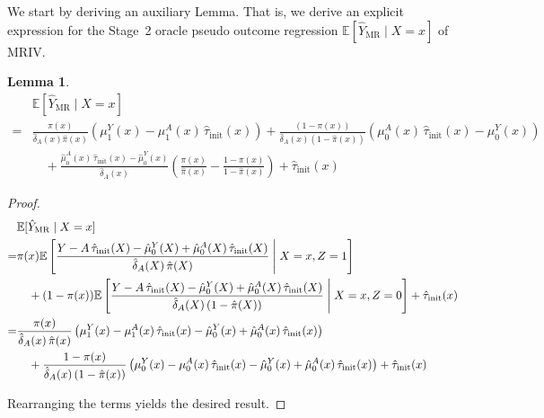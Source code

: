 \documentclass{article} %
\newcommand{\E}{\mathbb{E}}
\newcommand{\frameworkname}{MRIV\xspace}
\theoremstyle{definition}
\theoremstyle{plain}
\newtheorem{lemma}{Lemma}
\begin{document}
We start by deriving an auxiliary Lemma. That is, we derive an explicit expression for the Stage~2 oracle pseudo outcome regression $\E[\hat{Y}_{\mathrm{MR}} \mid X=x]$ of \frameworkname.
\begin{lemma}\label{lem:second_stage}
\begin{equation}
\begin{split}
    & \E[\hat{Y}_{\mathrm{MR}} \mid X=x] \\
    = & 
   \frac{\pi(x)}{\hat{\delta}_A(x) \hat{\pi}(x)} \left(\mu_1^Y(x) - \mu_1^A(x) \, \hat{\tau}_{\mathrm{init}}(x)\right)
   + \frac{(1-\pi(x))}{\hat{\delta}_A(x)(1 - \hat{\pi}(x))} \left(\mu_0^A(x) \, \hat{\tau}_{\mathrm{init}}(x) -\mu_0^Y(x) \right)\\ & \quad + 
   \frac{\hat{\mu}_0^A(x) \, \hat{\tau}_{\mathrm{init}}(x) - \hat{\mu}_0^Y (x)}{\hat{\delta}_A(x)} \left(\frac{\pi(x)}{\hat{\pi}(x)} - \frac{1- \pi(x)}{1-\hat{\pi}(x)} \right) + \hat{\tau}_{\mathrm{init}}(x)   
\end{split}
\end{equation}
\end{lemma}

\begin{proof}
\begin{align}
 &\E[\hat{Y}_{\mathrm{MR}} \mid X=x]\\ =& \pi(x) \E\left[ \frac{Y - A \, \hat{\tau}_{\mathrm{init}}(X) - \hat{\mu}_0^Y(X) + \hat{\mu}_0^A(X) \, \hat{\tau}_{\mathrm{init}}(X)} {\hat{\delta}_A(X) \, \hat{\pi}(X)} \; \middle| \; X = x, Z = 1\right] \notag\\ 
 & \quad + (1 - \pi(x)) \E\left[ \frac{Y - A \, \hat{\tau}_{\mathrm{init}}(X) - \hat{\mu}_0^Y(X) + \hat{\mu}_0^A(X) \, \hat{\tau}_{\mathrm{init}}(X)}{\hat{\delta}_A(X) \, (1 - \hat{\pi}(X))} \; \middle| \; X = x, Z = 0\right] + \hat{\tau}_{\mathrm{init}}(x)\\
  =& \frac{\pi(x)}{\hat{\delta}_A(x) \, \hat{\pi}(x)} \left( \mu_1^Y(x) - \mu_1^A(x) \, \hat{\tau}_{\mathrm{init}}(x) - \hat{\mu}_0^Y(x) + \hat{\mu}_0^A(x) \, \hat{\tau}_{\mathrm{init}}(x) \right) \notag \\
 & \quad + \frac{1-\pi(x)}{\hat{\delta}_A(x) \, (1-\hat{\pi}(x))} \left(\mu_0^Y(x) - \mu_0^A(x) \, \hat{\tau}_{\mathrm{init}}(x) - \hat{\mu}_0^Y(x) + \hat{\mu}_0^A(x) \, \hat{\tau}_{\mathrm{init}}(x) \right) + \hat{\tau}_{\mathrm{init}}(x)
\end{align}

Rearranging the terms yields the desired result.
\end{proof}
\end{document}
